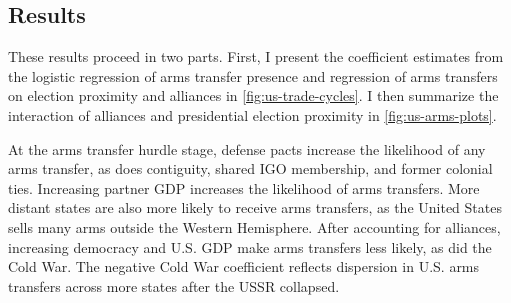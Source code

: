 \documentclass[12pt]{article}
\begin{document}
\subsection{Results}


These results proceed in two parts.
First, I present the coefficient estimates from the logistic regression of arms transfer presence and regression of arms transfers on election proximity and alliances in \autoref{fig:us-trade-cycles}.
I then summarize the interaction of alliances and presidential election proximity in \autoref{fig:us-arms-plots}.


At the arms transfer hurdle stage, defense pacts increase the likelihood of any arms transfer, as does contiguity, shared IGO membership, and former colonial ties.
Increasing partner GDP increases the likelihood of arms transfers.
More distant states are also more likely to receive arms transfers, as the United States sells many arms outside the Western Hemisphere. 
After accounting for alliances, increasing democracy and U.S. GDP make arms transfers less likely, as did the Cold War. 
The negative Cold War coefficient reflects dispersion in U.S. arms transfers across more states after the USSR collapsed.
\end{document}
